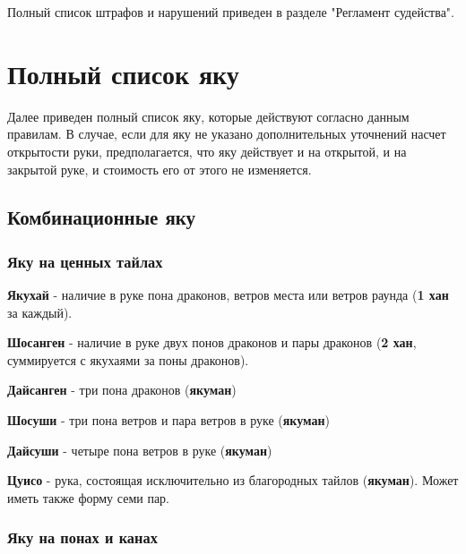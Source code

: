 Полный список штрафов и нарушений приведен в разделе "Регламент судейства".

\section{Полный список яку}

Далее приведен полный список яку, которые действуют согласно данным правилам. В случае, если для яку не указано дополнительных уточнений насчет открытости руки, предполагается, что яку действует и на открытой, и на закрытой руке, и стоимость его от этого не изменяется.

\subsection{Комбинационные яку}

\subsubsection{Яку на ценных тайлах}

\textbf{Якухай} - наличие в руке пона драконов, ветров места или ветров раунда (\textbf{1 хан} за каждый).

 \hfill {}

\textbf{Шосанген} - наличие в руке двух понов драконов и пары драконов (\textbf{2 хан}, суммируется с якухаями за поны драконов).

 \hfill {}

\textbf{Дайсанген} - три пона драконов (\textbf{якуман})

 \hfill {}

\textbf{Шосуши} - три пона ветров и пара ветров в руке (\textbf{якуман})

 \hfill {}

\textbf{Дайсуши} - четыре пона ветров в руке (\textbf{якуман})

 \hfill {}

\textbf{Цуисо} - рука, состоящая исключительно из благородных тайлов (\textbf{якуман}). Может иметь также форму семи пар.

 \hfill {}

\subsubsection{Яку на понах и канах}

